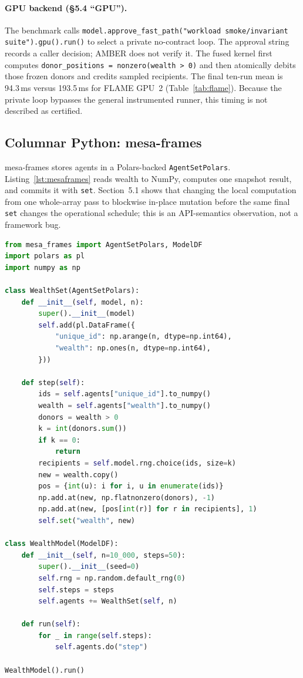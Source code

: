 \documentclass[sigconf,nonacm,review,natbib=true]{acmart}
\newcommand{\appendixbreak}{%
  \FloatBarrier
}
\theoremstyle{definition}
\theoremstyle{plain}
\theoremstyle{remark}
\begin{document}
\paragraph{GPU backend (\S5.4 ``GPU'').}
The benchmark calls
\texttt{model.approve\_fast\_path("workload smoke/invariant suite").gpu().run()}
to select a private no-contract loop. The approval string records a caller
decision; AMBER does not verify it. The fused kernel first computes
\texttt{donor\_positions = nonzero(wealth > 0)} and then atomically debits those
frozen donors and credits sampled recipients. The final ten-run mean is
94.3\,ms versus 193.5\,ms for FLAME GPU~2 (Table~\ref{tab:flame}). Because the
private loop bypasses the general instrumented runner, this timing is not
described as certified.

\appendixbreak
\subsection{Columnar Python: mesa-frames}
\label{app:usage:columnar}

mesa-frames \citep{mesaframes} stores agents in a Polars-backed
\texttt{AgentSetPolars}. Listing~\ref{lst:mesaframes} reads wealth to NumPy,
computes one snapshot result, and commits it with \texttt{set}. Section~5.1
shows that changing the local computation from one whole-array pass to
blockwise in-place mutation before the same final \texttt{set} changes the
operational schedule; this is an API-semantics observation, not a framework bug.
\begin{lstlisting}[style=applisting,language=Python,caption={mesa-frames wealth transfer (Polars \texttt{AgentSetPolars}).},label={lst:mesaframes}]
from mesa_frames import AgentSetPolars, ModelDF
import polars as pl
import numpy as np

class WealthSet(AgentSetPolars):
    def __init__(self, model, n):
        super().__init__(model)
        self.add(pl.DataFrame({
            "unique_id": np.arange(n, dtype=np.int64),
            "wealth": np.ones(n, dtype=np.int64),
        }))

    def step(self):
        ids = self.agents["unique_id"].to_numpy()
        wealth = self.agents["wealth"].to_numpy()
        donors = wealth > 0
        k = int(donors.sum())
        if k == 0:
            return
        recipients = self.model.rng.choice(ids, size=k)
        new = wealth.copy()
        pos = {int(u): i for i, u in enumerate(ids)}
        np.add.at(new, np.flatnonzero(donors), -1)
        np.add.at(new, [pos[int(r)] for r in recipients], 1)
        self.set("wealth", new)

class WealthModel(ModelDF):
    def __init__(self, n=10_000, steps=50):
        super().__init__(seed=0)
        self.rng = np.random.default_rng(0)
        self.steps = steps
        self.agents += WealthSet(self, n)

    def run(self):
        for _ in range(self.steps):
            self.agents.do("step")

WealthModel().run()
\end{lstlisting}
\end{document}
